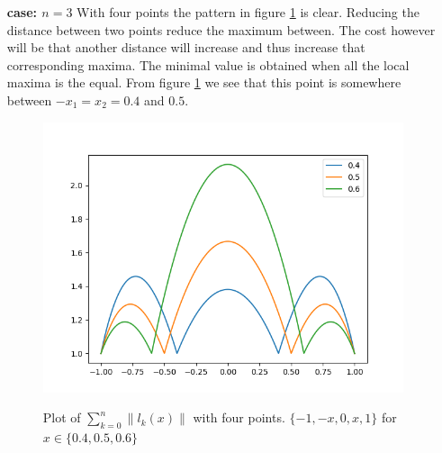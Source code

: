 \begin{solution}
\begin{enumerate}
\item[{\bf case: $n=3$}] With four points the pattern in figure
  \ref{fig:4n3} is clear. Reducing the distance between two points
  reduce the maximum between. The cost however will be that another
  distance will increase and thus increase that corresponding
  maxima. The minimal value is obtained when all the local maxima is
  the equal. From figure \ref{fig:4n3} we see that this point is
  somewhere between $-x_1 = x_2 = 0.4$ and $0.5$. 
  \begin{figure}[!ht]
      \centering \includegraphics[scale = 0.5]{code/task_4_n3.png}
      \label{fig:4n3}
      \caption{Plot of $\sum_{k=0}^n\|l_k(x)\|$ with four
        points. $\{-1, -x, 0, x, 1\}$ for $x \in \{0.4, 0.5, 0.6\}$}
  \end{figure}
\end{enumerate}
\end{solution}

